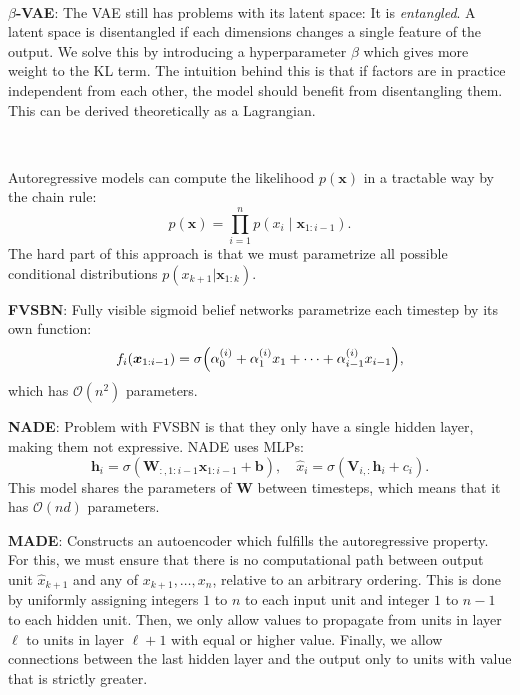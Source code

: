\documentclass{article}
\newcommand{\lft}{\mathopen{}\mathclose\bgroup\left}
\newcommand{\rgt}{\aftergroup\egroup\right}
\renewcommand{\vec}[1]{\bm{#1}}
\newcommand{\mat}[1]{\bm{#1}}
\newenvironment{topic}[1]
{\textbf{\sffamily \colorbox{black}{\rlap{\textbf{\textcolor{white}{#1}}}\hspace{\linewidth}\hspace{-2\fboxsep}}} \\ \vspace{0.2cm}}
{}
\begin{document}
\begin{multicols*}{2}
\begin{topic}{Autoencoders}
        \textbf{$\beta$-VAE}: The VAE still has problems with its latent space: It is \textit{entangled}. A
        latent space is disentangled if each dimensions changes a single feature of the output. We
        solve this by introducing a hyperparameter $\beta$ which gives more weight to the KL term. The
        intuition behind this is that if factors are in practice independent from each other, the
        model should benefit from disentangling them. This can be derived theoretically as a
        Lagrangian.

    \end{topic}

    \begin{topic}{Autoregressive models}

        Autoregressive models can compute the likelihood $p(\vec{x})$ in a tractable way by the chain rule: \[
            p(\vec{x}) = \prod_{i=1}^n p(x_i \mid \vec{x}_{1:i-1}).
        \]
        The hard part of this approach is that we must parametrize all possible conditional distributions
        $p(x_{k+1} | \vec{x}_{1:k})$.

        \textbf{FVSBN}: Fully visible sigmoid belief networks parametrize each timestep by its own function: \[
            f_i(\vec{x}_{1:i-1}) = \sigma \lft( \alpha_0^{(i)} + \alpha_1^{(i)} x_1 + \cdots + \alpha_{i-1}^{(i)} x_{i-1} \rgt),
        \]
        which has $\mathcal{O}(n^2)$ parameters.

        \textbf{NADE}: Problem with FVSBN is that they only have a single hidden layer, making them
        not expressive. NADE uses MLPs: \[
            \vec{h}_i = \sigma(\mat{W}_{:,1:i-1} \vec{x}_{1:i-1} + \vec{b}), \quad \hat{x}_i = \sigma(\mat{V}_{i,:} \vec{h}_i + c_i).
        \]
        This model shares the parameters of $\mat{W}$ between timesteps, which means that it has
        $\mathcal{O}(nd)$ parameters.

        \textbf{MADE}: Constructs an autoencoder which fulfills the autoregressive property. For this,
        we must ensure that there is no computational path between output unit $\hat{x}_{k+1}$ and
        any of $x_{k+1}, \ldots, x_n$, relative to an
        arbitrary ordering. This is done by uniformly assigning integers $1$ to $n$ to each input
        unit and integer $1$ to $n-1$ to each hidden unit. Then, we only allow values to propagate
        from units in layer $\ell$ to units in layer $\ell+1$ with equal or higher value. Finally,
        we allow connections between the last hidden layer and the output only to units with value
        that is strictly greater.


\end{topic}
\end{multicols*}
\end{document}
